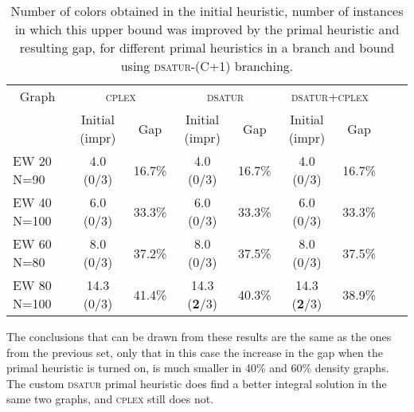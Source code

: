 \begin{table}[h]
\centering
\begin{tabular}{|l|cc|cc|cc|cc|}
\hline
\multicolumn{1}{|c|}{Graph} & \multicolumn{2}{|c|}{\textsc{cplex}} & \multicolumn{2}{|c|}{\textsc{dsatur}} & \multicolumn{2}{|c|}{\textsc{dsatur}+\textsc{cplex}}
\\
& Initial (impr) & Gap & Initial (impr) & Gap & Initial (impr) & Gap
\\
\hline
EW 20 N=90 & 4.0 (0/3) & 16.7\% & 4.0 (0/3) & 16.7\% & 4.0 (0/3) & 16.7\%
\\
EW 40 N=100 & 6.0 (0/3) & 33.3\% & 6.0 (0/3) & 33.3\% & 6.0 (0/3) & 33.3\%
\\
EW 60 N=80 & 8.0 (0/3) & 37.2\% & 8.0 (0/3) & 37.5\% & 8.0 (0/3) & 37.5\%
\\
EW 80 N=100 & 14.3 (0/3) & 41.4\% & 14.3 (\textbf{2}/3) & 40.3\% & 14.3 (\textbf{2}/3) & 38.9\%
\\
\hline 
 \end{tabular}
   
\caption{Number of colors obtained in the initial heuristic, number of instances in which this upper bound was improved by the primal heuristic and resulting gap, for different primal heuristics in a branch and bound using \textsc{dsatur-(C+1)} branching.}
\label{table:primal:dsatur}

\end{table}

The conclusions that can be drawn from these results are the same as the ones from the previous set, only that in this case the increase in the gap when the primal heuristic is turned on, is much smaller in 40\% and 60\% density graphs. The custom \textsc{dsatur} primal heuristic does find a better integral solution in the same two graphs, and \textsc{cplex} still does not. 


